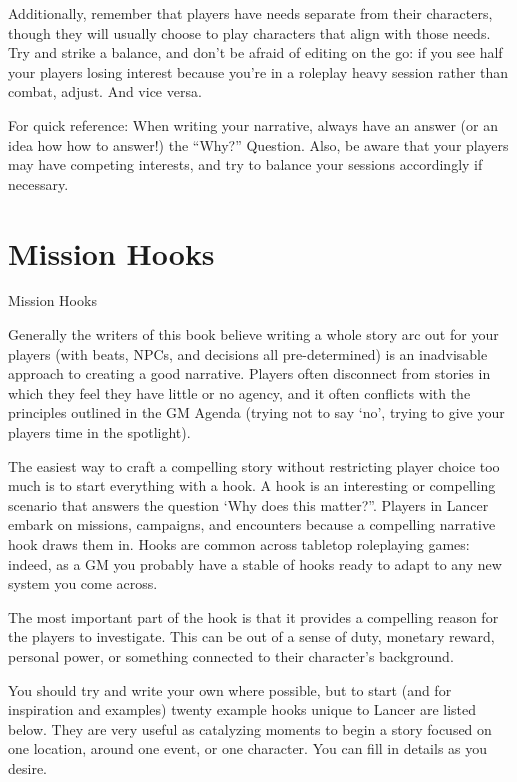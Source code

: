 Additionally, remember that players have needs separate from their characters, though they will  
usually choose to play characters that align with those needs. Try and strike a balance, and don’t  
be afraid of editing on the go: if you see half your players losing interest because you’re in a  
roleplay heavy session rather than combat, adjust. And vice versa. 
 

For quick reference: When writing your narrative, always have an answer (or an idea how how to  
answer!) the “Why?” Question. Also, be aware that your players may have competing interests,  
and try to balance your sessions accordingly if necessary. 
 

                                                                                                          
\section{Mission Hooks}

                                           Mission Hooks   

Generally the writers of this book believe writing a whole story arc out for your players (with  
beats, NPCs, and decisions all pre-determined) is an inadvisable approach to creating a good  
narrative. Players often disconnect from stories in which they feel they have little or no agency,  
and it often conflicts with the principles outlined in the GM Agenda (trying not to say ‘no’, trying  
to give your players time in the spotlight).
 

The easiest way to craft a compelling story without restricting player choice too much is to start  
everything with a hook. A hook is an interesting or compelling scenario that answers the  
question ‘Why does this matter?”. Players in Lancer embark on missions, campaigns, and  
encounters because a compelling narrative hook draws them in. Hooks are common across  
tabletop roleplaying games: indeed, as a GM you probably have a stable of hooks ready to adapt  
to any new system you come across. 
 

The most important part of the hook is that it provides a compelling reason for the players  
to investigate. This can be out of a sense of duty, monetary reward, personal power, or  
something connected to their character’s background.
 

You should try and write your own where possible, but to start (and for inspiration and examples)  
twenty example hooks unique to Lancer are listed below. They are very useful as catalyzing  
moments to begin a story focused on one location, around one event, or one character. You can  
fill in details as you desire.
 

